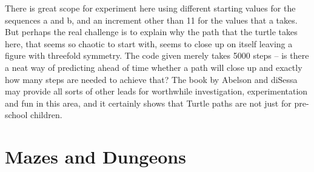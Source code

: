 There is great scope for experiment here using different starting
values for the sequences {\tx a} and {\tx b}, and an increment other than
11 for the values that {\tx a} takes. But perhaps the real challenge is
to explain why the path that the turtle takes here, that seems so chaotic to
start with, seems to close up on itself leaving a figure with threefold
symmetry. The code given merely takes 5000 steps -- is there a neat way
of predicting ahead of time whether a path will close up and exactly
how many steps are needed to achieve that? The book by Abelson and
diSessa\cite{Turtles} may provide all sorts of other leads for worthwhile
investigation, experimentation and fun in this area, and it certainly
shows that Turtle paths are not just for pre-school children.


\section{Mazes and Dungeons}

